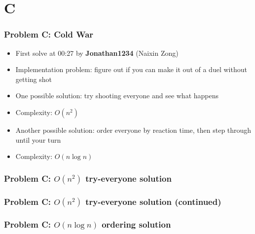 \section{C}%
\label{sec:c}

\begin{frame}
  \frametitle{Problem C: Cold War}

  \begin{itemize}
    \item First solve at 00:27 by \textbf{Jonathan1234} (Naixin Zong)
    \item Implementation problem: figure out if you can make it out of a duel without getting shot
    \item One possible solution: try shooting everyone and see what happens 
    \item Complexity: $O(n^2)$
    \item Another possible solution: order everyone by reaction time, then step through until your turn
    \item Complexity: $O(n \log n)$
  \end{itemize}

\end{frame}

\begin{frame}
  \frametitle{Problem C: $O(n^2)$ try-everyone solution}
\end{frame}

\begin{frame}
  \frametitle{Problem C: $O(n^2)$ try-everyone solution (continued)}
\end{frame}

\begin{frame}
  \frametitle{Problem C: $O(n \log n)$ ordering solution}
\end{frame}
